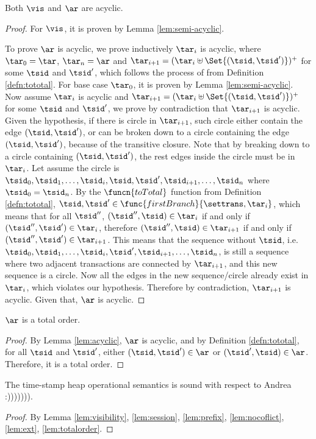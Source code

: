 \begin{lem}[Acyclic]
    \label{lem:acyclic}
    Both \( \vis \) and \( \ar \) are acyclic.
\end{lem}
\begin{proof}
    For \( \vis \), it is proven by Lemma \ref{lem:semi-acyclic}.

    To prove \( \ar \) is acyclic, we prove inductively \( \tar_{i} \) is acyclic, where \( \tar_{0} = \tar \), \( \tar_{n} = \ar \) and \( \tar_{i+1} = (\tar_{i} \uplus \Set{(\tsid, \tsid')})^{+} \) for some \( \tsid \) and \( \tsid' \), which follows the process of  from Definition \ref{defn:tototal}.
    For base case \( \tar_{0} \), it is proven by Lemma \ref{lem:semi-acyclic}.
    Now assume \( \tar_{i} \) is acyclic and \( \tar_{i+1} = (\tar_{i} \uplus \Set{(\tsid, \tsid')})^{+} \) for some \( \tsid \) and \( \tsid' \), we prove by contradiction that \( \tar_{i+1} \) is acyclic.
    Given the hypothesis, if there is circle in \( \tar_{i+1} \), such circle either contain the edge \( (\tsid, \tsid') \), or can be broken down to a circle containing the edge \( (\tsid, \tsid') \), because of the transitive closure.
    Note that by breaking down to a circle containing \( ( \tsid, \tsid' ) \), the rest edges inside the circle must be in \( \tar_{i} \).
    Let assume the circle is \( \tsid_{0}, \tsid_{1}, \dots, \tsid_{i}, \tsid, \tsid', \tsid_{i+1}, \dots, \tsid_{n} \) where \( \tsid_{0} = \tsid_{n} \).
    By the \( \funcn{toTotal} \) function from Definition \ref{defn:tototal}, \( \tsid, \tsid' \in \func{firstBranch}{\settrans, \tar_{i}}\), which means that for all \( \tsid'' \), \( (\tsid'', \tsid) \in \tar_{i} \) if and only if \( ( \tsid'', \tsid') \in \tar_{i} \), therefore \( (\tsid'', \tsid) \in \tar_{i+1} \) if and only if \( ( \tsid'', \tsid') \in \tar_{i+1} \).
    This means that the sequence without \( \tsid \), i.e.\ \( \tsid_{0}, \tsid_{1}, \dots, \tsid_{i}, \tsid', \tsid_{i+1}, \dots, \tsid_{n} \), is still a sequence where two adjacent transactions are connected by \( \tar_{i+1} \), and this new sequence is a circle.
    Now all the edges in the new sequence/circle already exist in \( \tar_{i} \), which violates our hypothesis.
    Therefore by contradiction, \( \tar_{i+1} \) is acyclic.
    Given that, \( \ar \) is acyclic.
\end{proof}

\begin{lem}
    \label{lem:totalorder}
    \( \ar \) is a total order.
\end{lem}
\begin{proof}
    By Lemma \ref{lem:acyclic}, \( \ar \) is acyclic, and by Definition \ref{defn:tototal}, for all \( \tsid \) and \( \tsid' \), either \( (\tsid, \tsid') \in \ar \) or \( (\tsid', \tsid) \in \ar \).
    Therefore, it is a total order.
\end{proof}

\begin{thm}
    The time-stamp heap operational semantics is sound with respect to Andrea :))))))).
\end{thm}
\begin{proof}
    By Lemma \ref{lem:visibility}, \ref{lem:session}, \ref{lem:prefix}, \ref{lem:nocoflict}, \ref{lem:ext}, \ref{lem:totalorder}.
\end{proof}
